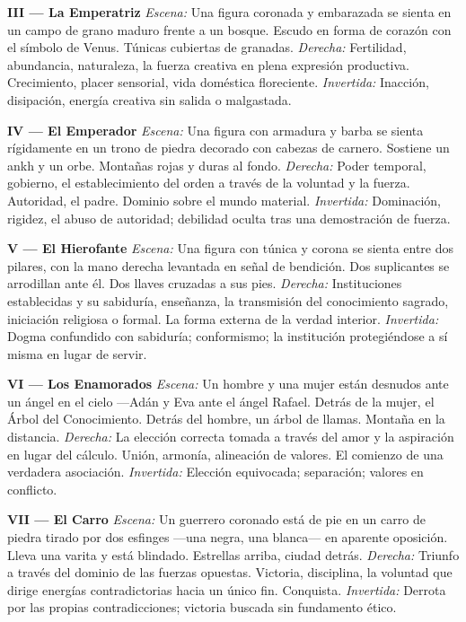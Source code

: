 \textbf{III --- La Emperatriz} \emph{Escena:} Una figura coronada y embarazada se sienta en un campo de grano maduro frente a un bosque. Escudo en forma de corazón con el símbolo de Venus. Túnicas cubiertas de granadas. \emph{Derecha:} Fertilidad, abundancia, naturaleza, la fuerza creativa en plena expresión productiva. Crecimiento, placer sensorial, vida doméstica floreciente. \emph{Invertida:} Inacción, disipación, energía creativa sin salida o malgastada.

\textbf{IV --- El Emperador} \emph{Escena:} Una figura con armadura y barba se sienta rígidamente en un trono de piedra decorado con cabezas de carnero. Sostiene un ankh y un orbe. Montañas rojas y duras al fondo. \emph{Derecha:} Poder temporal, gobierno, el establecimiento del orden a través de la voluntad y la fuerza. Autoridad, el padre. Dominio sobre el mundo material. \emph{Invertida:} Dominación, rigidez, el abuso de autoridad; debilidad oculta tras una demostración de fuerza.

\textbf{V --- El Hierofante} \emph{Escena:} Una figura con túnica y corona se sienta entre dos pilares, con la mano derecha levantada en señal de bendición. Dos suplicantes se arrodillan ante él. Dos llaves cruzadas a sus pies. \emph{Derecha:} Instituciones establecidas y su sabiduría, enseñanza, la transmisión del conocimiento sagrado, iniciación religiosa o formal. La forma externa de la verdad interior. \emph{Invertida:} Dogma confundido con sabiduría; conformismo; la institución protegiéndose a sí misma en lugar de servir.

\textbf{VI --- Los Enamorados} \emph{Escena:} Un hombre y una mujer están desnudos ante un ángel en el cielo ---Adán y Eva ante el ángel Rafael. Detrás de la mujer, el Árbol del Conocimiento. Detrás del hombre, un árbol de llamas. Montaña en la distancia. \emph{Derecha:} La elección correcta tomada a través del amor y la aspiración en lugar del cálculo. Unión, armonía, alineación de valores. El comienzo de una verdadera asociación. \emph{Invertida:} Elección equivocada; separación; valores en conflicto.

\textbf{VII --- El Carro} \emph{Escena:} Un guerrero coronado está de pie en un carro de piedra tirado por dos esfinges ---una negra, una blanca--- en aparente oposición. Lleva una varita y está blindado. Estrellas arriba, ciudad detrás. \emph{Derecha:} Triunfo a través del dominio de las fuerzas opuestas. Victoria, disciplina, la voluntad que dirige energías contradictorias hacia un único fin. Conquista. \emph{Invertida:} Derrota por las propias contradicciones; victoria buscada sin fundamento ético.

